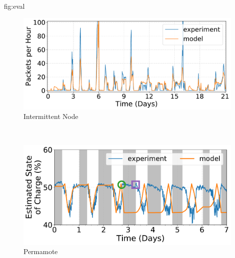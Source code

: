 \begin{definefigure}{fig:eval}
  \centering
  \begin{subfigure}{\columnwidth}
    \centering
    \includegraphics[width=\linewidth]{figs/capacity/experiment_pkt/exp_vs_sim_pkt}
    \caption{Intermittent Node}
    \label{fig:eval:pkt}
  \end{subfigure}\\%
  \begin{subfigure}{\columnwidth}
    \centering
    \includegraphics[width=\linewidth]{figs/capacity/experiment_soc/exp_vs_sim_soc}
    \caption{Permamote}
    \label{fig:eval:soc}
  \end{subfigure}
    \caption{Model comparison to deployed hardware.
    \normalfont
    Data from a three month deployment of two systems is used to verify our model.
    (a) We use three weeks of lux measurements %
    to estimate irradiance and model the number of packets transmitted by an
    intermittent node. Average daily error is 15\%, with a standard deviation
    of 17\%. (b) We model and measure a \name's state of charge while running a
    ``sense and send'' workload with a 1\,s period for a week, beginning at
    midnight on the first day. Secondary charging hysteresis
    limits of the devices are set at 51\% and 43\%. Shaded regions
}
\end{definefigure}
